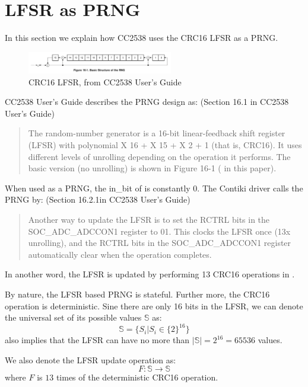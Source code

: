 \section{LFSR as PRNG} \label{LFSR}
In this section we explain how CC2538 uses the CRC16 LFSR as a PRNG. 

\begin{figure}[!t]
\centering
\includegraphics[width=2.5in]{fig/crc16.png}
\caption{CRC16 LFSR, from CC2538 User's Guide}
\label{CRC16}
\end{figure}

CC2538 User's Guide describes the PRNG design as: (Section 16.1 in CC2538 User's Guide)
\begin{quote}
The random-number generator is a 16-bit linear-feedback shift register (LFSR) with polynomial X 16 + X 15 +
X 2 + 1 (that is, CRC16). It uses different levels of unrolling depending on the operation it performs. The basic version (no unrolling) is shown in Figure 16-1 ( in this paper).
\end{quote}

When used as a PRNG, the in\_bit of  is constantly $0$. The Contiki driver calls the PRNG by: (Section 16.2.1in CC2538 User's Guide)
\begin{quote}
Another way to update the LFSR is to set the RCTRL bits in the SOC\_ADC\_ADCCON1 register to 01. This clocks the LFSR once (13x unrolling), and the RCTRL bits in the SOC\_ADC\_ADCCON1 register automatically clear when the operation completes.
\end{quote}

In another word, the LFSR is updated by performing 13 CRC16 operations in .

By nature, the LFSR based PRNG is stateful. Further more, the CRC16 operation is deterministic. Sine there are only 16 bits in the LFSR, we can denote the universal set of its  possible values $\mathbb{S}$ as:
\begin{equation} \label{PRNGState}
\mathbb{S} = \{ S_{i} | S_{i} \in \{2\}^{16}\}
\end{equation}
 also implies that the LFSR can have no more than $|\mathbb{S}| = 2^{16} = 65536$ values.

We also denote the LFSR update operation as:
\begin{equation}
F:\mathbb{S} \rightarrow \mathbb{S}
\end{equation}
where $F$ is $13$ times of the deterministic CRC16 operation.

